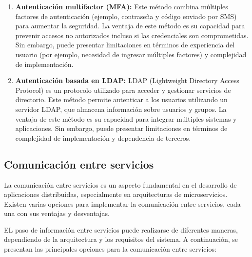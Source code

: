 \begin{enumerate}
    \item \textbf{Autenticación multifactor (MFA)\cite{auth_oauth2}:} Este método combina múltiples factores de autenticación (ejemplo, contraseña y código enviado por SMS) para aumentar la seguridad. La ventaja de este método es su capacidad para prevenir accesos no autorizados incluso si las credenciales son comprometidas. Sin embargo, puede presentar limitaciones en términos de experiencia del usuario (por ejemplo, necesidad de ingresar múltiples factores) y complejidad de implementación.
    \item \textbf{Autenticación basada en LDAP\cite{auth_ldap}:} LDAP (Lightweight Directory Access Protocol) es un protocolo utilizado para acceder y gestionar servicios de directorio. Este método permite autenticar a los usuarios utilizando un servidor LDAP, que almacena información sobre usuarios y grupos. La ventaja de este método es su capacidad para integrar múltiples sistemas y aplicaciones. Sin embargo, puede presentar limitaciones en términos de complejidad de implementación y dependencia de terceros.    
\end{enumerate}

\subsection{Comunicación entre servicios}

La comunicación entre servicios es un aspecto fundamental en el desarrollo de aplicaciones distribuidas, especialmente en arquitecturas de microservicios. Existen varias opciones para implementar la comunicación entre servicios, cada una con sus ventajas y desventajas.\newline

EL paso de información entre servicios puede realizarse de diferentes maneras, dependiendo de la arquitectura y los requisitos del sistema. A continuación, se presentan las principales opciones para la comunicación entre servicios:

